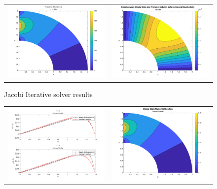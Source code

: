 \documentclass[11pt]{article}
\begin{document}
\begin{enumerate}
\begin{enumerate}
\begin{figure}[htp]
\begin{tabular}{cc}
            \includegraphics[width=3.5in]{p31} & \includegraphics[width=3.5in]{p41}
        \end{tabular}
        \caption{Jacobi Iterative solver results}
        \label{fig:P_Jacobi}
    \end{figure}
    \begin{figure}[htp]
        \centering
        \begin{tabular}{cc}
            \includegraphics[width=3.5in]{p12} & \includegraphics[width=3.5in]{p22} \\ 

\end{tabular}
\end{figure}
\end{enumerate}
\end{enumerate}
\end{document}
